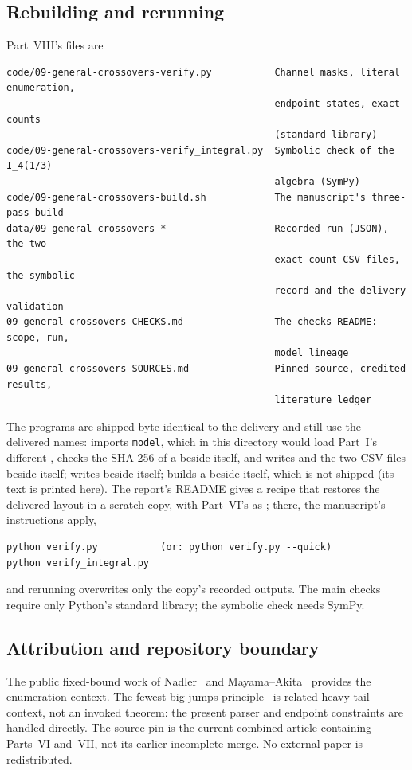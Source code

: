 \documentclass[11pt,a4paper]{article}
\theoremstyle{definition}\newaliascnt{definition}{theorem}
\theoremstyle{remark}\newaliascnt{remark}{theorem}
\begin{document}
\subsection{Rebuilding and rerunning}
\label{gc:sec:reproduce}
Part~VIII's files are
\begin{lstlisting}
code/09-general-crossovers-verify.py           Channel masks, literal enumeration,
                                               endpoint states, exact counts
                                               (standard library)
code/09-general-crossovers-verify_integral.py  Symbolic check of the I_4(1/3)
                                               algebra (SymPy)
code/09-general-crossovers-build.sh            The manuscript's three-pass build
data/09-general-crossovers-*                   Recorded run (JSON), the two
                                               exact-count CSV files, the symbolic
                                               record and the delivery validation
09-general-crossovers-CHECKS.md                The checks README: scope, run,
                                               model lineage
09-general-crossovers-SOURCES.md               Pinned source, credited results,
                                               literature ledger
\end{lstlisting}
The programs are shipped byte-identical to the delivery and still use the
delivered names:  imports \texttt{model}, which in this
directory would load Part~I's different , checks the
SHA-256 of a  beside itself, and writes  and
the two CSV files beside itself;  writes
 beside itself;  builds a
 beside itself, which is not shipped (its
text is printed here). The report's README gives a recipe that restores the
delivered layout in a scratch copy, with Part~VI's
 as ; there, the
manuscript's instructions apply,
\begin{verbatim}
python verify.py           (or: python verify.py --quick)
python verify_integral.py
\end{verbatim}
and rerunning overwrites only the copy's recorded outputs. The main checks
require only Python's standard library; the symbolic check needs SymPy.

\subsection{Attribution and repository boundary}
\label{gc:sec:boundary}
The public fixed-bound work of Nadler~\cite{Nadler} and
Mayama--Akita~\cite{MayamaAkita} provides the enumeration context. The
fewest-big-jumps principle~\cite{pr:KerriouMorters} is related heavy-tail
context, not an invoked theorem: the present parser and endpoint constraints
are handled directly. The source pin is the current combined article
containing Parts~VI and~VII, not its earlier incomplete merge. No external
paper is redistributed.
\end{document}
